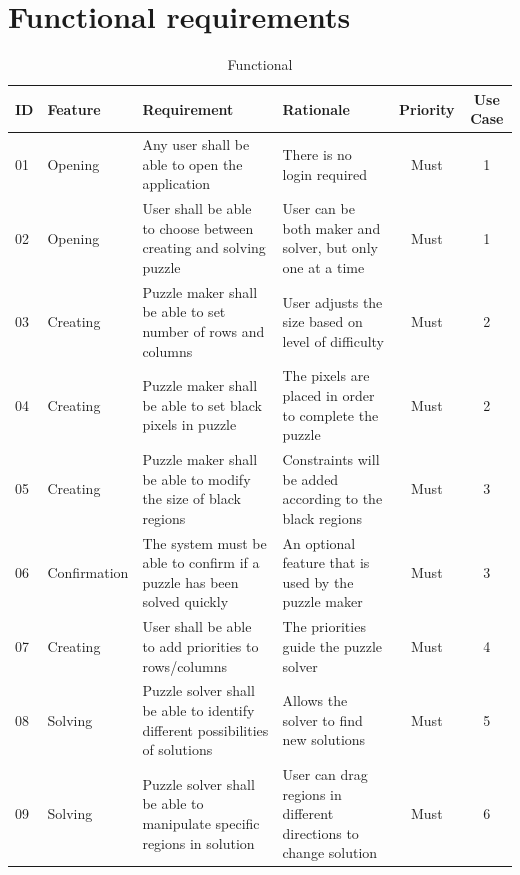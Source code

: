 \documentclass[12pt]{article}
\begin{document}
\section{Functional requirements}
\begin{table}[htbp]
\caption{Functional}
\begin{center}
\begin{tabularx}{\textwidth}{|p{0.4cm} | p{1.5cm}| X| p{3.35cm}| c| c|}
\hline
\textbf{ID} & \textbf{Feature} & \textbf{Requirement} & \textbf{Rationale} & \textbf{Priority} & \textbf{Use Case}\\
\hline\hline
01 & Opening & Any user shall be able to open the application & There is no login required & Must & 1\\
\hline
02 & Opening & User shall be able to choose between creating and solving puzzle & User can be both maker and solver, but only one at a time & Must & 1 \\
\hline
03 & Creating & Puzzle maker shall be able to set number of rows and columns & User adjusts the size based on level of difficulty  & Must & 2 \\
\hline
04 & Creating & Puzzle maker shall be able to set black pixels in puzzle & The pixels are placed in order to complete the puzzle & Must & 2 \\
\hline
05 & Creating & Puzzle maker shall be able to modify the size of black regions & Constraints will be added according to the black regions & Must & 3 \\
\hline
06 & Confirmation & The system must be able to confirm if a puzzle has been solved quickly & An optional feature that is used by the puzzle maker & Must & 3 \\
\hline
07 & Creating & User shall be able to add priorities to rows/columns & The priorities guide the puzzle solver & Must & 4 \\
\hline
08 & Solving & Puzzle solver shall be able to identify different possibilities of solutions & Allows the solver to find new solutions & Must & 5 \\
\hline
09 & Solving & Puzzle solver shall be able to manipulate specific regions in solution & User can drag regions in different directions to change solution & Must & 6 \\
\hline
\end{tabularx}
\end{center}
\end{table}
\end{document}

